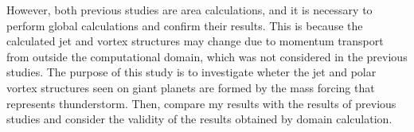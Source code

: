 \documentclass[a4j,12pt,openbib,oneside]{jreport}
\begin{document}
However, both previous studies are area calculations, 
and it is necessary to perform global calculations and confirm their results.
%
This is because the calculated jet and vortex structures 
may change due to momentum transport from outside the computational domain, 
which was not considered in the previous studies.
%
The purpose of this study is to investigate
wheter the jet and polar vortex structures seen on giant planets are
formed by the mass forcing that represents thunderstorm.
%
Then, compare my results with the results of previous studies and 
consider the validity of the results obtained by domain calculation.
\end{document}
